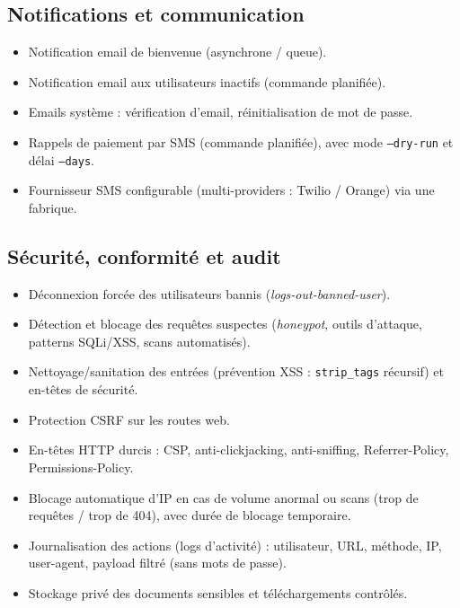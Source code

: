 \documentclass[12pt, a4paper]{article}
\begin{document}
\subsection{Notifications et communication}
\begin{itemize}
    \item Notification email de bienvenue (asynchrone / queue).
    \item Notification email aux utilisateurs inactifs (commande planifiée).
    \item Emails système : vérification d'email, réinitialisation de mot de passe.
    \item Rappels de paiement par SMS (commande planifiée), avec mode \texttt{--dry-run} et délai \texttt{--days}.
    \item Fournisseur SMS configurable (multi-providers : Twilio / Orange) via une fabrique.
\end{itemize}

\subsection{Sécurité, conformité et audit}
\begin{itemize}
    \item Déconnexion forcée des utilisateurs bannis (\textit{logs-out-banned-user}).
    \item Détection et blocage des requêtes suspectes (\textit{honeypot}, outils d'attaque, patterns SQLi/XSS, scans automatisés).
    \item Nettoyage/sanitation des entrées (prévention XSS : \texttt{strip\_tags} récursif) et en-têtes de sécurité.
    \item Protection CSRF sur les routes web.
    \item En-têtes HTTP durcis : CSP, anti-clickjacking, anti-sniffing, Referrer-Policy, Permissions-Policy.
    \item Blocage automatique d'IP en cas de volume anormal ou scans (trop de requêtes / trop de 404), avec durée de blocage temporaire.
    \item Journalisation des actions (logs d'activité) : utilisateur, URL, méthode, IP, user-agent, payload filtré (sans mots de passe).
    \item Stockage privé des documents sensibles et téléchargements contrôlés.
\end{itemize}
\end{document}
